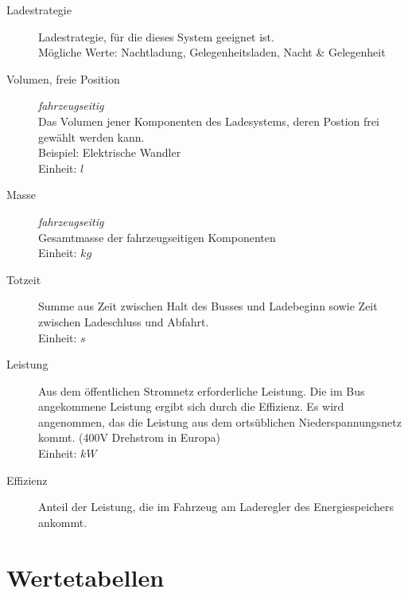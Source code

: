 \begin{description}
	\item [Ladestrategie] Ladestrategie, für die dieses System geeignet ist.\\
	Mögliche Werte: Nachtladung, Gelegenheitsladen, Nacht \& Gelegenheit
	\item [Volumen, freie Position] \emph{fahrzeugseitig}\\
	Das Volumen jener Komponenten des Ladesystems, deren Postion frei gewählt werden kann.\\
	Beispiel: Elektrische Wandler\\
	Einheit: $l$
	\item [Masse] \emph{fahrzeugseitig}\\
	Gesamtmasse der fahrzeugseitigen Komponenten\\
	Einheit: $kg$
	\item [Totzeit]
	Summe aus Zeit zwischen Halt des Busses und Ladebeginn sowie Zeit zwischen Ladeschluss und Abfahrt.\\
	Einheit: $s$
	\item [Leistung]
	Aus dem öffentlichen Stromnetz erforderliche Leistung. Die im Bus angekommene Leistung ergibt sich durch die Effizienz. Es wird angenommen, das die Leistung aus dem ortsüblichen Niederspannungsnetz kommt. (400V Drehstrom in Europa)\\
	Einheit: $kW$
	\item [Effizienz]
	Anteil der Leistung, die im Fahrzeug am Laderegler des Energiespeichers ankommt.
\end{description}


\section{Wertetabellen}
\label{sec_tabellen_ladesysteme}
\FloatBarrier
